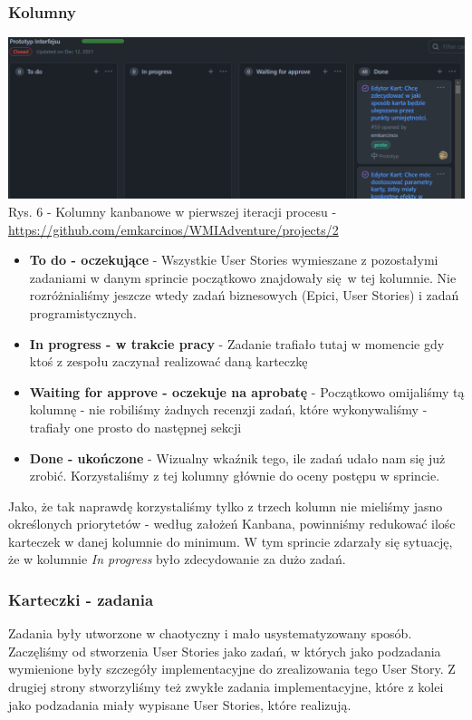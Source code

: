 \documentclass{article}
\begin{document}
\subsubsection*{Kolumny}
\begin{center}
    \includegraphics[scale=0.35]{old_kanban.png}
    \newline
    Rys. 6 - Kolumny kanbanowe w pierwszej iteracji procesu - \url{https://github.com/emkarcinos/WMIAdventure/projects/2}
\end{center}
\begin{itemize}
    \item \textbf{To do - oczekujące} - Wszystkie User Stories wymieszane z pozostałymi zadaniami w danym sprincie początkowo znajdowały się w tej kolumnie. Nie rozróżnialiśmy jeszcze wtedy zadań biznesowych (Epici, User Stories) i zadań programistycznych.
    \item \textbf{In progress - w trakcie pracy} - Zadanie trafiało tutaj w momencie gdy ktoś z zespołu zaczynał realizować daną karteczkę
    \item \textbf{Waiting for approve - oczekuje na aprobatę} - Początkowo omijaliśmy tą kolumnę - nie robiliśmy żadnych recenzji zadań, które wykonywaliśmy - trafiały one prosto do następnej sekcji
    \item \textbf{Done - ukończone} - Wizualny wkaźnik tego, ile zadań udało nam się już zrobić. Korzystaliśmy z tej kolumny głównie do oceny postępu w sprincie.
\end{itemize}

Jako, że tak naprawdę korzystaliśmy tylko z trzech kolumn nie mieliśmy jasno określonych priorytetów - według założeń Kanbana, powinniśmy redukować ilośc karteczek w danej kolumnie do minimum. W tym sprincie zdarzały się sytuację, że w kolumnie \textit{In progress} było zdecydowanie za dużo zadań.

\subsubsection*{Karteczki - zadania}
Zadania były utworzone w chaotyczny i mało usystematyzowany sposób. Zaczęliśmy od stworzenia User Stories jako zadań, w których jako podzadania wymienione były szczegóły implementacyjne do zrealizowania tego User Story. Z drugiej strony stworzyliśmy też zwykłe zadania implementacyjne, które z kolei jako podzadania miały wypisane User Stories, które realizują.
\end{document}
